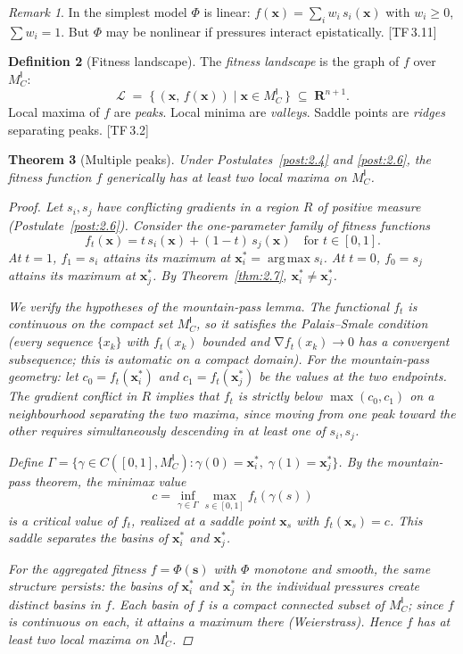\documentclass[10pt]{article}
\theoremstyle{definition}
\newtheorem{definition}{Definition}[section]
\theoremstyle{plain}
\newtheorem{theorem}[definition]{Theorem}
\theoremstyle{remark}
\newtheorem{remark}[definition]{Remark}
\newcommand{\MC}{M^{\mathsf{I}}_C}          %
\providecommand{\R}{}
\renewcommand{\R}{\mathbf{R}}               %
\newcommand{\FitLand}{\mathcal{L}}           %
\DeclareMathOperator{\grad}{\nabla}
\DeclareMathOperator{\argmax}{arg\,max}
\newcommand{\TF}[1]{\textnormal{[TF\,#1]}}  %
\begin{document}
\begin{remark}
In the simplest model $\Phi$ is linear:
$f(\bm{x}) = \sum_i w_i \, s_i(\bm{x})$ with $w_i \geq 0$,
$\sum w_i = 1$. But $\Phi$ may be nonlinear if pressures interact
epistatically. \TF{3.11}
\end{remark}

\begin{definition}[Fitness landscape]\label{def:3.2}
The \emph{fitness landscape} is the graph of $f$ over $\MC$:
\[
  \FitLand \;=\; \bigl\{\, (\bm{x},\, f(\bm{x}))
    \;\big|\; \bm{x} \in \MC \,\bigr\}
  \;\subseteq\; \R^{n+1}.
\]
Local maxima of $f$ are \emph{peaks}. Local minima are
\emph{valleys}. Saddle points are \emph{ridges} separating peaks. \TF{3.2}
\end{definition}

\begin{theorem}[Multiple peaks]\label{thm:3.3}
Under Postulates~\ref{post:2.4} and \ref{post:2.6}, the fitness function
$f$ generically has at least two local maxima on $\MC$.

\begin{proof}
Let $s_i, s_j$ have conflicting gradients in a region $R$ of
positive measure (Postulate~\ref{post:2.6}).
Consider the one-parameter family of fitness functions
\[
  f_t(\bm{x}) = t \, s_i(\bm{x}) + (1-t) \, s_j(\bm{x})
  \quad\text{for } t \in [0,1].
\]
At $t = 1$, $f_1 = s_i$ attains its maximum at
$\bm{x}_i^* = \argmax s_i$. At $t = 0$, $f_0 = s_j$ attains its
maximum at $\bm{x}_j^*$. By Theorem~\ref{thm:2.7},
$\bm{x}_i^* \neq \bm{x}_j^*$.

We verify the hypotheses of the mountain-pass lemma. The functional
$f_t$ is continuous on the compact set $\MC$, so it satisfies the
Palais--Smale condition (every sequence $\{x_k\}$ with
$f_t(x_k)$ bounded and $\grad f_t(x_k) \to 0$ has a convergent
subsequence; this is automatic on a compact domain). For the
mountain-pass geometry: let $c_0 = f_t(\bm{x}_i^*)$ and
$c_1 = f_t(\bm{x}_j^*)$ be the values at the two endpoints.
The gradient conflict in $R$ implies that $f_t$ is strictly
below $\max(c_0, c_1)$ on a neighbourhood separating the two maxima,
since moving from one peak toward the other requires simultaneously
descending in at least one of $s_i, s_j$.

Define $\Gamma = \{\gamma \in C([0,1], \MC) :
\gamma(0) = \bm{x}_i^*,\; \gamma(1) = \bm{x}_j^*\}$.
By the mountain-pass theorem, the minimax value
\[
  c = \inf_{\gamma \in \Gamma}
  \max_{s \in [0,1]} f_t(\gamma(s))
\]
is a critical value of $f_t$, realized at a saddle point
$\bm{x}_s$ with $f_t(\bm{x}_s) = c$. This saddle separates the
basins of $\bm{x}_i^*$ and $\bm{x}_j^*$.

For the aggregated fitness $f = \Phi(\bm{s})$ with $\Phi$
monotone and smooth, the same structure persists: the basins of
$\bm{x}_i^*$ and $\bm{x}_j^*$ in the individual pressures create
distinct basins in $f$. Each basin of $f$ is a compact connected
subset of $\MC$; since $f$ is continuous on each, it attains a
maximum there (Weierstrass). Hence $f$ has at least two local
maxima on $\MC$. \qedhere
\end{proof}
\end{theorem}
\end{document}
